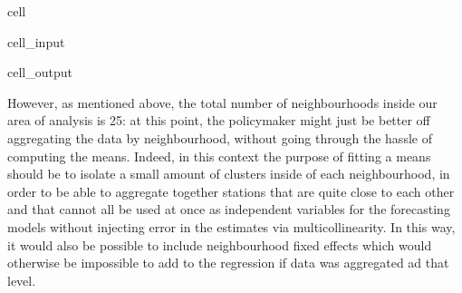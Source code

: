 \documentclass[letterpaper,10pt,english]{jupyterBook}
\begin{document}
\begin{sphinxuseclass}{cell}
\begin{sphinxuseclass}{cell_input}
\begin{sphinxVerbatim}[commandchars=\\\{\}]
         
          


    

\end{sphinxVerbatim}

\end{sphinxuseclass}
\begin{sphinxuseclass}{cell_output}
\noindent{}

\end{sphinxuseclass}
\end{sphinxuseclass}
\sphinxAtStartPar
However, as mentioned above, the total number of neighbourhoods inside our area of analysis is 25: at this point, the policymaker might just be better off aggregating the data by neighbourhood, without going through the hassle of computing the \sphinxhyphen{}means. Indeed, in this context the purpose of fitting a \sphinxhyphen{}means should be to isolate a small amount of clusters inside of each neighbourhood, in order to be able to aggregate together stations that are quite close to each other and that cannot all be used at once as independent variables for the forecasting models without injecting error in the estimates via multicollinearity. In this way, it would also be possible to include neighbourhood fixed effects \sphinxhyphen{} which would otherwise be impossible to add to the regression if data was aggregated ad that level.
\end{document}
